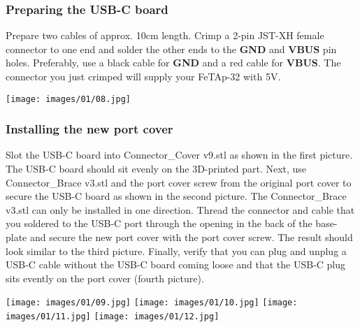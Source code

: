 \documentclass[]{article}
\begin{document}
\subsubsection{Preparing the USB-C board}
\begin{minipage}[t]{0.4\linewidth}
	\vspace{0pt}
	Prepare two cables of approx. 10cm length. Crimp a 2-pin JST-XH female connector to one end and solder the other ends to the \textbf{GND} and \textbf{VBUS} pin holes.
	\newline
	\newline
	Preferably, use a black cable for \textbf{GND} and a red cable for \textbf{VBUS}. The connector you just crimped will supply your FeTAp-32 with 5V.
\end{minipage}
\hfill
\begin{minipage}[t]{0.5\linewidth}
	\vspace{0pt}
	\texttt{[image: images/01/08.jpg]}
\end{minipage}

\subsubsection{Installing the new port cover}
\begin{minipage}[t]{0.4\linewidth}
	\vspace{0pt}
	Slot the USB-C board into Connector\_Cover v9.stl as shown in the first picture. The USB-C board should sit evenly on the 3D-printed part.
	\newline
	\newline
	Next, use Connector\_Brace v3.stl and the port cover screw from the original port cover to secure the USB-C board as shown in the second picture. The Connector\_Brace v3.stl can only be installed in one direction.
	\newline
	\newline
	Thread the connector and cable that you soldered to the USB-C port through the opening in the back of the base-plate and secure the new port cover with the port cover screw. The result should look similar to the third picture.
	\newline
	\newline
	Finally, verify that you can plug and unplug a USB-C cable without the USB-C board coming loose and that the USB-C plug sits evently on the port cover (fourth picture).
\end{minipage}
\hfill
\begin{minipage}[t]{0.35\linewidth}
	\vspace{0pt}
	\texttt{[image: images/01/09.jpg]}
	\texttt{[image: images/01/10.jpg]}
	\texttt{[image: images/01/11.jpg]}
	\texttt{[image: images/01/12.jpg]}
\end{minipage}
\end{document}
